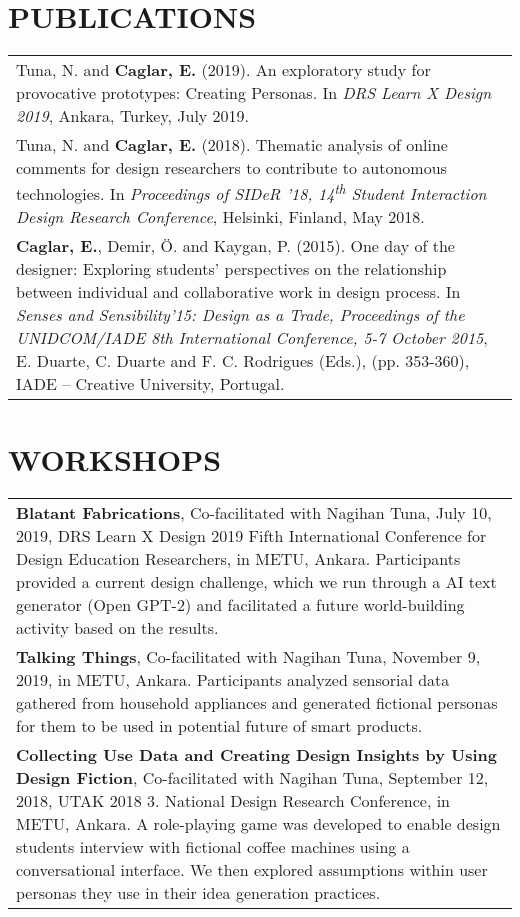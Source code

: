 \begin{curriculumvitae}
\section*{PUBLICATIONS}
\begingroup
\renewcommand{\arraystretch}{1.4}
\begin{tabular}{p{\textwidth}}
	\hangindent=0.5cm
	Tuna, N. and \textbf{Caglar, E.} (2019). An exploratory study for provocative prototypes: Creating Personas. In \emph{DRS Learn X Design 2019}, Ankara, Turkey, July 2019.\\%
	\hangindent=0.5cm
	
	Tuna, N. and \textbf{Caglar, E.} (2018). Thematic analysis of online comments for design researchers to contribute to autonomous technologies. In \emph{Proceedings of SIDeR '18, 14\textsuperscript{th} Student Interaction Design Research Conference}, Helsinki, Finland, May 2018.\\%
	\hangindent=0.5cm
	
	\textbf{Caglar, E.}, Demir, Ö. and Kaygan, P. (2015). One day of the designer: Exploring students’ perspectives on the relationship between individual and collaborative work in design process. In \emph{Senses and Sensibility’15: Design as a Trade, Proceedings of the UNIDCOM/IADE 8th International Conference, 5-7 October 2015}, E. Duarte, C. Duarte and F. C. Rodrigues (Eds.), (pp. 353-360), IADE – Creative University, Portugal.\\%
	
\end{tabular}
\endgroup

\section*{WORKSHOPS}
\begingroup
\renewcommand{\arraystretch}{1.4}
\begin{tabular}{p{\textwidth}}
	\textbf{Blatant Fabrications}, Co-facilitated with Nagihan Tuna, July 10, 2019, DRS Learn X Design 2019 Fifth International Conference for Design Education Researchers, in METU, Ankara. Participants provided a current design challenge, which we run through a AI text generator (Open GPT-2) and facilitated a future world-building activity based on the results.\\
	\textbf{Talking Things}, Co-facilitated with Nagihan Tuna, November 9, 2019, in METU, Ankara. Participants analyzed sensorial data gathered from household appliances and generated fictional personas for them to be used in potential future of smart products.\\
	\textbf{Collecting Use Data and Creating Design Insights by Using Design Fiction}, Co-facilitated with Nagihan Tuna, September 12, 2018, UTAK 2018 3. National Design Research Conference, in METU, Ankara. A role-playing game was developed to enable design students interview with fictional coffee machines using a conversational interface. We then explored assumptions within user personas they use in their idea generation practices.\\
\end{tabular}
\endgroup

\end{curriculumvitae}